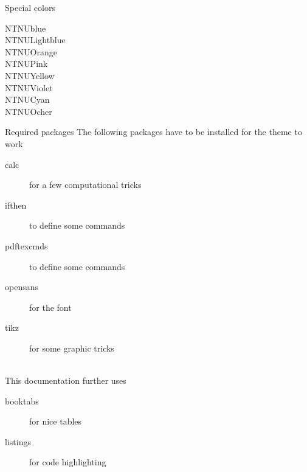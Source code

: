 \documentclass[aspectratio=169]{beamer}
\begin{document}
	\begin{frame}{Special colors}
		\begin{description}
			\item[{\color{NTNUBlue} NTNUblue}]
			\item[{\color{NTNULightblue} NTNULightblue}]
			\item[{\color{NTNUOrange} NTNUOrange}]
			\item[{\color{NTNUPink} NTNUPink}]
			\item[{\color{NTNUYellow} NTNUYellow}]
			\item[{\color{NTNUViolet} NTNUViolet}]
			\item[{\color{NTNUCyan} NTNUCyan}]
			\item[{\color{NTNUOcher} NTNUOcher}]
		\end{description}
	\end{frame}
	\begin{frame}{Required packages}
		The following packages have to be installed for the theme to work
		\begin{description}
			\item[calc] for a few computational tricks
			\item[ifthen] to define some commands
			\item[pdftexcmds] to define some commands
			\item[opensans] for the font
			\item[tikz] for some graphic tricks
		\end{description}
		\ \\[\baselineskip]
		This documentation further uses
		\begin{description}
			\item[booktabs] for nice tables
			\item[listings] for code highlighting
		\end{description}
	\end{frame}
\end{document}
